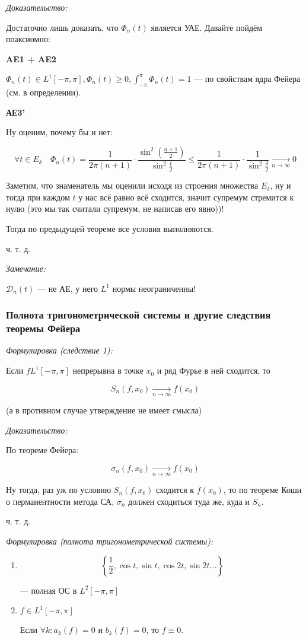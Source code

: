 \documentclass{article}
\def\goesto#1{\underset{#1}{\longrightarrow}}
\def\toinf#1{\goesto{#1 \rightarrow \infty}}
\def\ntoinf{\toinf{n}}
\def\DD{\mathcal{D}}
\begin{document}
\textit{Доказательство:}

Достаточно лишь доказать, что $\Phi_n(t)$ является УАЕ. Давайте пойдём поаксиомно:

\textbf{AE1 + AE2}

$\Phi_n(t) \in L^1[-\pi, \pi], \Phi_n(t) \ge 0, \int_{-\pi}^{\pi} \Phi_n(t) = 1$ --- по свойствам ядра Фейера (см. в определении).

\textbf{АЕ3'}

Ну оценим, почему бы и нет: 

\[\forall t \in E_\delta \quad \Phi_n(t) = \frac{1}{2\pi (n + 1)} \cdot \frac{\sin^2\left(\frac{n + 1}{2}\right)}{\sin^2 \frac{t}{2}} \le \frac{1}{2\pi (n + 1)} \cdot \frac{1}{\sin^2 \frac{\delta}{2}} \ntoinf 0\]

Заметим, что знаменатель мы оценили исходя из строения множества $E_\delta$, ну и тогда при каждом $t$ у нас всё равно всё сходится, значит супремум стремится к нулю (это мы так считали супремум, не написав его явно))! 

Тогда по предыдущей теореме все условия выполняются.

ч. т. д.

\textit{Замечание:}

$\DD_n(t)$ --- не АЕ, у него $L^1$ нормы неограниченны!


\subsubsection{Полнота тригонометрической системы и другие следствия теоремы Фейера}
\textit{Формулировка (следствие 1):}

Если $f L^1[-\pi, \pi]$ непрерывна в точке $x_0$ и ряд Фурье в ней сходится, то

\[S_n(f, x_0) \ntoinf f(x_0)\]

(а в противном случае утверждение не имеет смысла)

\textit{Доказательство:}

По теореме Фейера:

\[\sigma_n(f, x_0) \ntoinf f(x_0)\]

Ну тогда, раз уж по условию $S_n(f, x_0)$ сходится к $f(x_0)$, то по теореме Коши о перманентности метода СА, $\sigma_n$ должен сходиться туда же, куда и $S_n$.

ч. т. д. 

\textit{Формулировка (полнота тригонометрической системы):}

\begin{enumerate}
    \item \[\left\{\frac{1}{2}, \cos t, \sin t, \cos 2t, \sin 2t \ldots \right\}\]

    --- полная ОС в $L^2[-\pi, \pi]$
    \item $f \in L^1[-\pi, \pi]$
    
    Если $\forall k: a_k(f) = 0$ и $b_k(f) = 0$, то $f \equiv 0$.
\end{enumerate}
\end{document}
